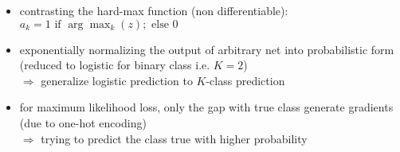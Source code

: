 \begin{itemize}
\begin{itemize}
		\begin{itemize}
		\item contrasting the hard-max function (non differentiable): $a_k = 1 \text{ if } \displaystyle \arg\max_k(z); \text{ else } 0$
		\item exponentially normalizing the output of arbitrary net into probabilistic form \\
		(reduced to logistic for binary class i.e. $K=2$) \\
		$\Rightarrow$ generalize logistic prediction to $K$-class prediction
		\item for maximum likelihood loss, only the gap with true class generate gradients \\ 
		(due to one-hot encoding) \\ 
		$\Rightarrow$ trying to predict the class true with higher probability
		\end{itemize}
	\end{itemize}


\end{itemize}
